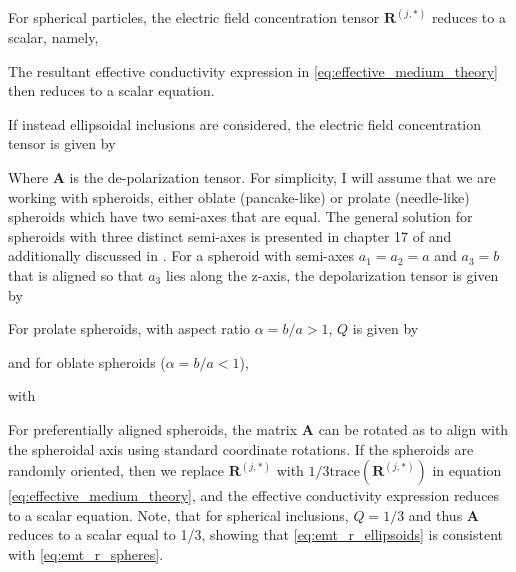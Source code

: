 For spherical particles, the electric field concentration tensor $\mathbf{R}^{(j,*)}$ reduces to a scalar, namely,

The resultant effective conductivity expression in \ref{eq:effective_medium_theory} then reduces to a scalar equation.

If instead ellipsoidal inclusions are considered, the electric field concentration tensor is given by

Where $\mathbf{A}$ is the de-polarization tensor. For simplicity, I will assume that we are working with spheroids, either oblate (pancake-like) or prolate (needle-like) spheroids which have two semi-axes that are equal. The general solution for spheroids with three distinct semi-axes is presented in chapter 17 of \cite{Torquato2002} and additionally discussed in \cite{Berryman2013}. For a spheroid with semi-axes $a_1 = a_2 = a$ and $a_3 = b$ that is aligned so that $a_3$ lies along the z-axis, the depolarization tensor is given by

For prolate spheroids, with aspect ratio $\alpha = b/a > 1$, $Q$ is given by

and for oblate spheroids ($\alpha = b/a < 1$),

with

For preferentially aligned spheroids, the matrix $\mathbf{A}$ can be rotated as to align with the spheroidal axis using standard coordinate rotations. If the spheroids are randomly oriented, then we replace $\mathbf{R}^{(j,*)}$ with $1/3\text{trace}(\mathbf{R}^{(j,*)})$ in equation \ref{eq:effective_medium_theory}, and the effective conductivity expression reduces to a scalar equation. Note, that for spherical inclusions, $Q = 1/3$ and thus $\mathbf{A}$ reduces to a scalar equal to 1/3, showing that \ref{eq:emt_r_ellipsoids} is consistent with \ref{eq:emt_r_spheres}.

